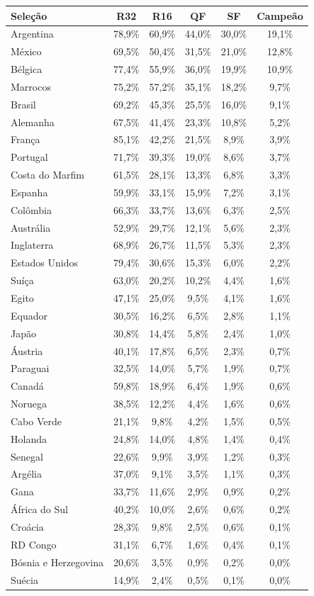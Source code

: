 \begin{longtable}{lccccc}
\toprule
Sele\c{c}\~ao & R32 & R16 & QF & SF & Campe\~ao \\
\midrule
\endhead
Argentina & 78,9\% & 60,9\% & 44,0\% & 30,0\% & 19,1\% \\
México & 69,5\% & 50,4\% & 31,5\% & 21,0\% & 12,8\% \\
Bélgica & 77,4\% & 55,9\% & 36,0\% & 19,9\% & 10,9\% \\
Marrocos & 75,2\% & 57,2\% & 35,1\% & 18,2\% & 9,7\% \\
Brasil & 69,2\% & 45,3\% & 25,5\% & 16,0\% & 9,1\% \\
Alemanha & 67,5\% & 41,4\% & 23,3\% & 10,8\% & 5,2\% \\
França & 85,1\% & 42,2\% & 21,5\% & 8,9\% & 3,9\% \\
Portugal & 71,7\% & 39,3\% & 19,0\% & 8,6\% & 3,7\% \\
Costa do Marfim & 61,5\% & 28,1\% & 13,3\% & 6,8\% & 3,3\% \\
Espanha & 59,9\% & 33,1\% & 15,9\% & 7,2\% & 3,1\% \\
Colômbia & 66,3\% & 33,7\% & 13,6\% & 6,3\% & 2,5\% \\
Austrália & 52,9\% & 29,7\% & 12,1\% & 5,6\% & 2,3\% \\
Inglaterra & 68,9\% & 26,7\% & 11,5\% & 5,3\% & 2,3\% \\
Estados Unidos & 79,4\% & 30,6\% & 15,3\% & 6,0\% & 2,2\% \\
Suíça & 63,0\% & 20,2\% & 10,2\% & 4,4\% & 1,6\% \\
Egito & 47,1\% & 25,0\% & 9,5\% & 4,1\% & 1,6\% \\
Equador & 30,5\% & 16,2\% & 6,5\% & 2,8\% & 1,1\% \\
Japão & 30,8\% & 14,4\% & 5,8\% & 2,4\% & 1,0\% \\
Áustria & 40,1\% & 17,8\% & 6,5\% & 2,3\% & 0,7\% \\
Paraguai & 32,5\% & 14,0\% & 5,7\% & 1,9\% & 0,7\% \\
Canadá & 59,8\% & 18,9\% & 6,4\% & 1,9\% & 0,6\% \\
Noruega & 38,5\% & 12,2\% & 4,4\% & 1,6\% & 0,6\% \\
Cabo Verde & 21,1\% & 9,8\% & 4,2\% & 1,5\% & 0,5\% \\
Holanda & 24,8\% & 14,0\% & 4,8\% & 1,4\% & 0,4\% \\
Senegal & 22,6\% & 9,9\% & 3,9\% & 1,2\% & 0,3\% \\
Argélia & 37,0\% & 9,1\% & 3,5\% & 1,1\% & 0,3\% \\
Gana & 33,7\% & 11,6\% & 2,9\% & 0,9\% & 0,2\% \\
África do Sul & 40,2\% & 10,0\% & 2,6\% & 0,6\% & 0,2\% \\
Croácia & 28,3\% & 9,8\% & 2,5\% & 0,6\% & 0,1\% \\
RD Congo & 31,1\% & 6,7\% & 1,6\% & 0,4\% & 0,1\% \\
Bósnia e Herzegovina & 20,6\% & 3,5\% & 0,9\% & 0,2\% & 0,0\% \\
Suécia & 14,9\% & 2,4\% & 0,5\% & 0,1\% & 0,0\% \\
\bottomrule
\end{longtable}
